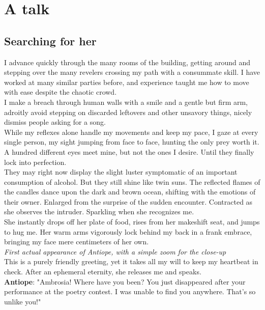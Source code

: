 \documentclass{report}
\newcommand{\dcomment}[1]{
	\emph{#1}
	\\
}
\newcommand{\speaker}[1]{
	\textbf{#1}: 
}
\newcommand{\gsection}[1]{
	\section*{#1}
	\label{#1}
}
\begin{document}
\chapter{A talk}

\gsection{Searching for her}

I advance quickly through the many rooms of the building, getting around and stepping over the many revelers crossing my path with a consummate skill. I have worked at many similar parties before, and experience taught me how to move with ease despite the chaotic crowd.\\

I make a breach through human walls with a smile and a gentle but firm arm, adroitly avoid stepping on discarded leftovers and other unsavory things, nicely dismiss people asking for a song.\\

While my reflexes alone handle my movements and keep my pace, I gaze at every single person, my sight jumping from face to face, hunting the only prey worth it. A hundred different eyes meet mine, but not the ones I desire. Until they finally lock into perfection.\\

They may right now display the slight luster symptomatic of an important consumption of alcohol. But they still shine like twin suns. The reflected flames of the candles dance upon the dark and brown ocean, shifting with the emotions of their owner. Enlarged from the surprise of the sudden encounter. Contracted as she observes the intruder. Sparkling when she recognizes me.\\

She instantly drops off her plate of food, rises from her makeshift seat, and jumps to hug me. Her warm arms vigorously lock behind my back in a frank embrace, bringing my face mere centimeters of her own.\\

\dcomment{
	First actual appearance of Antiope, with a simple zoom for the close-up
}

This is a purely friendly greeting, yet it takes all my will to keep my heartbeat in check. After an ephemeral eternity, she releases me and speaks.\\

\speaker{Antiope} "Ambrosia! Where have you been? You just disappeared after your performance at the poetry contest. I was unable to find you anywhere. That's so unlike you!"\\
\end{document}
